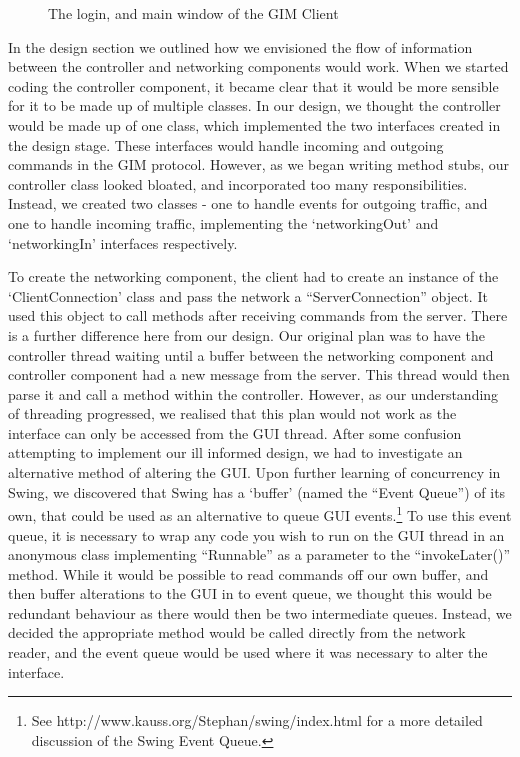\begin{figure}
\begin{center}
        \caption{The login, and main window of the GIM Client}
        \label{MainWindowDia}
    \end{center}
\end{figure}

In the design section we outlined how we envisioned the flow of information between the controller and networking components would work. When we started coding the controller component, it became clear that it would be more sensible for it to be made up of multiple classes. In our design, we thought the controller would be made up of one class, which implemented the two interfaces created in the design stage. These interfaces would handle incoming and outgoing commands in the GIM protocol. However, as we began writing method stubs, our controller class looked bloated, and incorporated too many responsibilities. Instead, we created two classes - one to handle events for outgoing traffic, and one to handle incoming traffic, implementing the `networkingOut' and `networkingIn' interfaces respectively.

To create the networking component, the client had to create an instance of the `ClientConnection' class and pass the network a ``ServerConnection'' object. It used this object to call methods after receiving commands from the server. There is a further difference here from our design. Our original plan was to have the controller thread waiting until a buffer between the networking component and controller component had a new message from the server. This thread would then parse it and call a method within the controller. However, as our understanding of threading progressed, we realised that this plan would not work as the interface can only be accessed from the GUI thread. After some confusion attempting to implement our ill informed design, we had to investigate an alternative method of altering the GUI. Upon further learning of concurrency in Swing, we discovered that Swing has a `buffer' (named the ``Event Queue'') of its own, that could be used as an alternative to queue GUI events.\footnote{See http://www.kauss.org/Stephan/swing/index.html for a more detailed discussion of the Swing Event Queue.} To use this event queue, it is necessary to wrap any code you wish to run on the GUI thread in an anonymous class implementing ``Runnable'' as a parameter to the ``invokeLater()'' method.  While it would be possible to read commands off our own buffer, and then buffer alterations to the GUI in to event queue, we thought this would be redundant behaviour as there would then be two intermediate queues. Instead, we decided the appropriate method would be called directly from the network reader, and the event queue would be used where it was necessary to alter the interface.

